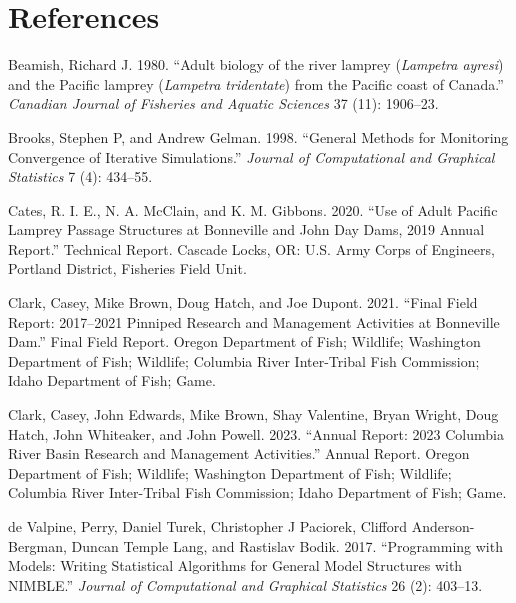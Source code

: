 \documentclass[
]{article}
\newlength{\cslhangindent}
\newenvironment{CSLReferences}[2] %
 {\begin{list}{}{%
  \setlength{\itemindent}{0pt}
  \setlength{\leftmargin}{0pt}
  \setlength{\parsep}{0pt}
  \ifodd #1
   \setlength{\leftmargin}{\cslhangindent}
   \setlength{\itemindent}{-1\cslhangindent}
  \fi
  \setlength{\itemsep}{#2\baselineskip}}}
 {\end{list}}
\begin{document}
\section*{References}\label{references}

\label{refs}
\begin{CSLReferences}{1}{0}
Beamish, Richard J. 1980. {``{Adult biology of the river lamprey
(\emph{Lampetra ayresi}) and the Pacific lamprey (\emph{Lampetra
tridentate}) from the Pacific coast of Canada}.''} \emph{Canadian
Journal of Fisheries and Aquatic Sciences} 37 (11): 1906--23.

Brooks, Stephen P, and Andrew Gelman. 1998. {``General Methods for
Monitoring Convergence of Iterative Simulations.''} \emph{Journal of
Computational and Graphical Statistics} 7 (4): 434--55.

Cates, R. I. E., N. A. McClain, and K. M. Gibbons. 2020. {``{Use of
Adult Pacific Lamprey Passage Structures at Bonneville and John Day
Dams, 2019 Annual Report}.''} Technical Report. Cascade Locks, OR: U.S.
Army Corps of Engineers, Portland District, Fisheries Field Unit.

Clark, Casey, Mike Brown, Doug Hatch, and Joe Dupont. 2021. {``Final
Field Report: 2017--2021 Pinniped Research and Management Activities at
Bonneville Dam.''} Final Field Report. Oregon Department of Fish;
Wildlife; Washington Department of Fish; Wildlife; Columbia River
Inter-Tribal Fish Commission; Idaho Department of Fish; Game.

Clark, Casey, John Edwards, Mike Brown, Shay Valentine, Bryan Wright,
Doug Hatch, John Whiteaker, and John Powell. 2023. {``Annual Report:
2023 Columbia River Basin Research and Management Activities.''} Annual
Report. Oregon Department of Fish; Wildlife; Washington Department of
Fish; Wildlife; Columbia River Inter-Tribal Fish Commission; Idaho
Department of Fish; Game.

de Valpine, Perry, Daniel Turek, Christopher J Paciorek, Clifford
Anderson-Bergman, Duncan Temple Lang, and Rastislav Bodik. 2017.
{``Programming with Models: Writing Statistical Algorithms for General
Model Structures with NIMBLE.''} \emph{Journal of Computational and
Graphical Statistics} 26 (2): 403--13.


\end{CSLReferences}
\end{document}

